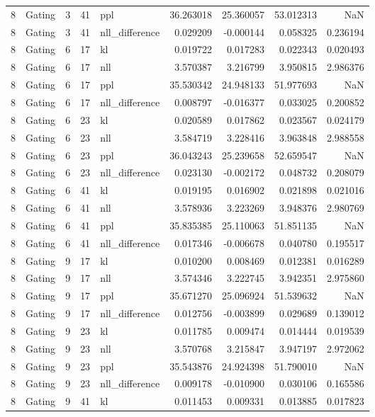 \begin{tabular}{rlrrlrrrr}
8 & Gating & 3 & 41 & ppl & 36.263018 & 25.360057 & 53.012313 & NaN \\
8 & Gating & 3 & 41 & nll_difference & 0.029209 & -0.000144 & 0.058325 & 0.236194 \\
8 & Gating & 6 & 17 & kl & 0.019722 & 0.017283 & 0.022343 & 0.020493 \\
8 & Gating & 6 & 17 & nll & 3.570387 & 3.216799 & 3.950815 & 2.986376 \\
8 & Gating & 6 & 17 & ppl & 35.530342 & 24.948133 & 51.977693 & NaN \\
8 & Gating & 6 & 17 & nll_difference & 0.008797 & -0.016377 & 0.033025 & 0.200852 \\
8 & Gating & 6 & 23 & kl & 0.020589 & 0.017862 & 0.023567 & 0.024179 \\
8 & Gating & 6 & 23 & nll & 3.584719 & 3.228416 & 3.963848 & 2.988558 \\
8 & Gating & 6 & 23 & ppl & 36.043243 & 25.239658 & 52.659547 & NaN \\
8 & Gating & 6 & 23 & nll_difference & 0.023130 & -0.002172 & 0.048732 & 0.208079 \\
8 & Gating & 6 & 41 & kl & 0.019195 & 0.016902 & 0.021898 & 0.021016 \\
8 & Gating & 6 & 41 & nll & 3.578936 & 3.223269 & 3.948376 & 2.980769 \\
8 & Gating & 6 & 41 & ppl & 35.835385 & 25.110063 & 51.851135 & NaN \\
8 & Gating & 6 & 41 & nll_difference & 0.017346 & -0.006678 & 0.040780 & 0.195517 \\
8 & Gating & 9 & 17 & kl & 0.010200 & 0.008469 & 0.012381 & 0.016289 \\
8 & Gating & 9 & 17 & nll & 3.574346 & 3.222745 & 3.942351 & 2.975860 \\
8 & Gating & 9 & 17 & ppl & 35.671270 & 25.096924 & 51.539632 & NaN \\
8 & Gating & 9 & 17 & nll_difference & 0.012756 & -0.003899 & 0.029689 & 0.139012 \\
8 & Gating & 9 & 23 & kl & 0.011785 & 0.009474 & 0.014444 & 0.019539 \\
8 & Gating & 9 & 23 & nll & 3.570768 & 3.215847 & 3.947197 & 2.972062 \\
8 & Gating & 9 & 23 & ppl & 35.543876 & 24.924398 & 51.790010 & NaN \\
8 & Gating & 9 & 23 & nll_difference & 0.009178 & -0.010900 & 0.030106 & 0.165586 \\
8 & Gating & 9 & 41 & kl & 0.011453 & 0.009331 & 0.013885 & 0.017823 \\

\end{tabular}

